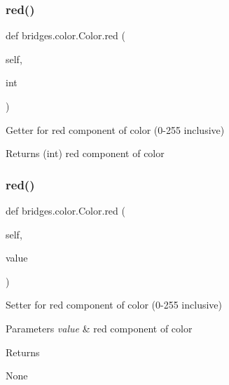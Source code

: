 \subsubsection{\texorpdfstring{red()}{red()}\hspace{0.1cm}{\footnotesize\ttfamily [1/2]}}
{\footnotesize\ttfamily def bridges.\+color.\+Color.\+red (\begin{DoxyParamCaption}\item[{}]{self,  }\item[{}]{int }\end{DoxyParamCaption})}



Getter for red component of color (0-\/255 inclusive) 

\begin{DoxyReturn}{Returns}
(int) red component of color 
\end{DoxyReturn}
\mbox{\label{classbridges_1_1color_1_1_color_a39719b281c9095293a1445c6deb7792b}} 
\subsubsection{\texorpdfstring{red()}{red()}\hspace{0.1cm}{\footnotesize\ttfamily [2/2]}}
{\footnotesize\ttfamily def bridges.\+color.\+Color.\+red (\begin{DoxyParamCaption}\item[{}]{self,  }\item[{}]{value }\end{DoxyParamCaption})}



Setter for red component of color (0-\/255 inclusive) 


\begin{DoxyParams}{Parameters}
{\em value} & red component of color \\
\hline
\end{DoxyParams}
\begin{DoxyReturn}{Returns}


None 
\end{DoxyReturn}
\mbox{\label{classbridges_1_1color_1_1_color_a7653dfb80aa5ec25ed14314ffa79d1f2}} 
